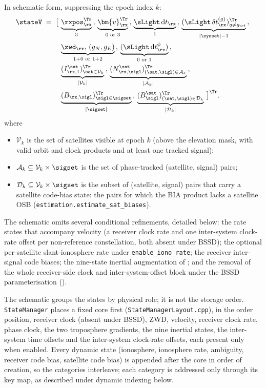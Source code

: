 In schematic form, suppressing the epoch index $k$:
\begin{align}
\stateV \;=\; \big[\,
& \underbrace{\rxpos_\rx^{\Tr}}_{3} \,,\,
  \underbrace{\bm{v}_\rx^{\Tr}}_{0\text{ or }3} \,,\,
  \underbrace{\sLight\,\mathrm{d}t_\rx}_{1} \,,\,
  \underbrace{(\sLight\,\delta t^{(g)}_\rx)_{g\neq g_{\mathrm{ref}}}^{\Tr}}_{|\sysset|-1} \,,\, \notag\\
& \underbrace{\zwd_\rx,\,(g_N, g_E)}_{1+0\text{ or }1+2} \,,\,
  \underbrace{(\sLight\,\mathrm{d}t^{\phi}_\rx)}_{0\text{ or }1} \,,\, \notag\\
& \underbrace{(I^\sat_{\rx,1})_{\sat \in \mathcal{V}_k}^{\Tr}}_{|\mathcal{V}_k|} \,,\,
  \underbrace{(N^\sat_{\rx,\sigl})_{(\sat,\sigl) \in \mathcal{A}_k}^{\Tr}}_{|\mathcal{A}_k|} \,,\, \notag\\
& \underbrace{(B_{\rx,\sigl})_{\sigl \in \sigset}^{\Tr}}_{|\sigset|} \,,\,
  \underbrace{(B^\sat_\sigl)_{(\sat,\sigl) \in \mathcal{D}_k}^{\Tr}}_{|\mathcal{D}_k|}
\,\big]^{\Tr}.
\end{align}
where
\begin{itemize}[leftmargin=*, itemsep=0pt]
\item $\mathcal{V}_k$ is the set of satellites visible at epoch $k$
      (above the elevation mask, with valid orbit and clock products and
      at least one tracked signal);
\item $\mathcal{A}_k \subseteq \mathcal{V}_k \times \sigset$ is the set
      of phase-tracked (satellite, signal) pairs;
\item $\mathcal{D}_k \subseteq \mathcal{V}_k \times \sigset$ is the
      subset of (satellite, signal) pairs that carry a satellite
      code-bias state: the pairs for which the BIA product lacks a
      satellite OSB (\texttt{estimation.estimate\_sat\_biases}).
\end{itemize}
The schematic omits several conditional refinements, detailed below: the
rate states that accompany velocity (a receiver clock rate and one
inter-system clock-rate offset per non-reference constellation, both
absent under BSSD); the optional per-satellite slant-ionosphere rate
under \texttt{enable\_iono\_rate}; the receiver inter-signal code biases;
the nine-state inertial augmentation of ; and the removal of the whole receiver-side clock and
inter-system-offset block under the BSSD parameterisation
().

The schematic groups the states by physical role; it is not the storage
order.  \texttt{StateManager} places a fixed core first
(\texttt{StateManagerLayout.cpp}), in the order position, receiver clock
(absent under BSSD), ZWD, velocity, receiver clock rate, phase clock, the
two troposphere gradients, the nine inertial states, the inter-system time
offsets and the inter-system clock-rate offsets, each present only when
enabled.  Every dynamic state (ionosphere, ionosphere rate, ambiguity,
receiver code bias, satellite code bias) is appended after the core in
order of creation, so the categories interleave; each category is addressed
only through its key map, as described under dynamic indexing below.

